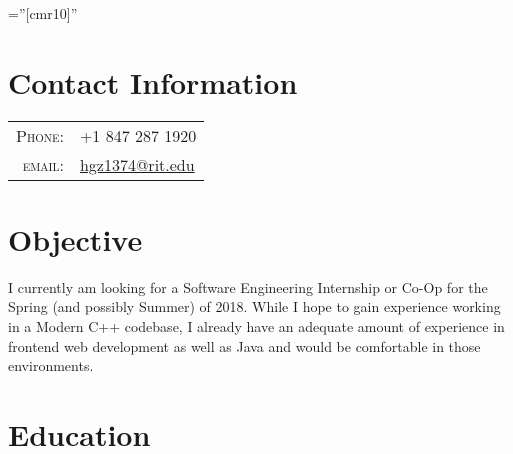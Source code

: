 \documentclass[a4paper,10pt]{article} %
\begin{document}
\pagestyle{empty} %

\font\fb=''[cmr10]'' %


\par{\par} %

\section{Contact Information}

\begin{tabular}{rl}
\textsc{Phone:} & +1 847 287 1920\\
\textsc{email:} & \href{mailto:hgz1374@rit.edu}{hgz1374@rit.edu}
\end{tabular}

\section{Objective}
\small{
    I currently am looking for a Software Engineering Internship or Co-Op for the Spring (and possibly Summer) of 2018.
    While I hope to gain experience working in a Modern C++ codebase, I already have an adequate amount of experience in frontend web development as well as Java and would be comfortable in those environments.
}


\section{Education}
\end{document}
